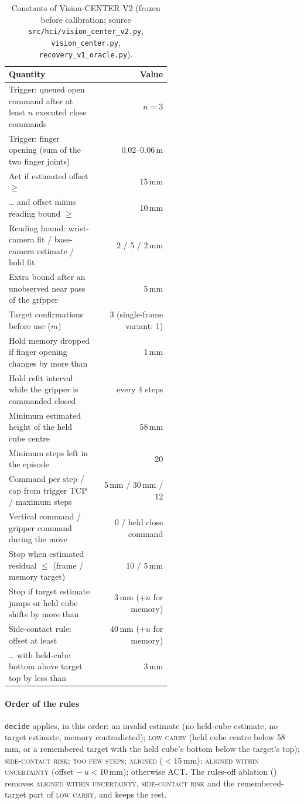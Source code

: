 \begin{table}[!htbp]
\centering\footnotesize
\caption{Constants of Vision-CENTER V2 (frozen before calibration; source \texttt{src/hci/vision\_center\_v2.py}, \texttt{vision\_center.py}, \texttt{recovery\_v1\_oracle.py}).}\label{tab:s-const}
\begin{tabular}{p{0.55\linewidth}r}
\toprule
Quantity & Value\\
\midrule
Trigger: queued open command after at least $n$ executed close commands & $n=3$\\
Trigger: finger opening (sum of the two finger joints) & 0.02--0.06\,m\\
Act if estimated offset $\ge$ & 15\,mm\\
\ldots{} and offset minus reading bound $\ge$ & 10\,mm\\
Reading bound: wrist-camera fit / base-camera estimate / hold fit & 2 / 5 / 2\,mm\\
Extra bound after an unobserved near pass of the gripper & 5\,mm\\
Target confirmations before use ($m$) & 3 (single-frame variant: 1)\\
Hold memory dropped if finger opening changes by more than & 1\,mm\\
Hold refit interval while the gripper is commanded closed & every 4 steps\\
Minimum estimated height of the held cube centre & 58\,mm\\
Minimum steps left in the episode & 20\\
Command per step / cap from trigger TCP / maximum steps & 5\,mm / 30\,mm / 12\\
Vertical command / gripper command during the move & 0 / held close command\\
Stop when estimated residual $\le$ (frame / memory target) & 10 / 5\,mm\\
Stop if target estimate jumps or held cube shifts by more than & 3\,mm (+$u$ for memory)\\
Side-contact rule: offset at least & 40\,mm (+$u$ for memory)\\
\ldots{} with held-cube bottom above target top by less than & 3\,mm\\
\bottomrule
\end{tabular}
\end{table}

\paragraph{Order of the rules} \texttt{decide} applies, in this order: an invalid estimate (no held-cube estimate, no target estimate, memory contradicted); \textsc{low carry} (held cube centre below 58\,mm, or a remembered target with the held cube's bottom below the target's top); \textsc{side-contact risk}; \textsc{too few steps}; \textsc{aligned} ($<15$\,mm); \textsc{aligned within uncertainty} (offset $-\,u<10$\,mm); otherwise ACT. The rules-off ablation () removes \textsc{aligned within uncertainty}, \textsc{side-contact risk} and the remembered-target part of \textsc{low carry}, and keeps the rest.

